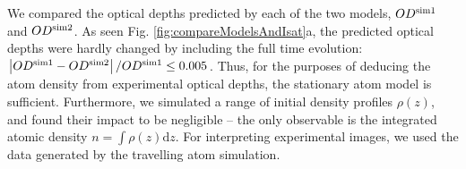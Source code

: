 \documentclass[12pt]{iopart}
\begin{document}
\par We compared the optical depths predicted by each of the two models, $OD^{\rm{sim1}}$ and $OD^{\rm{sim2}}$. As seen Fig. \ref{fig:compareModelsAndIsat}a, the predicted optical depths were hardly changed by including the full time evolution:  $\left|OD^{\rm{sim1}}-OD^{\rm{sim2}}\right|/OD^{\rm{sim1}} \le 0.005$. Thus, for the purposes of deducing the atom density from experimental optical depths, the stationary atom model is sufficient. Furthermore, we simulated a range of initial density profiles $\rho(z)$, and found their impact to be negligible \--- the only observable is the integrated atomic density $n=\int\rho(z)\mathrm{d}z$. For interpreting experimental images, we used the data generated by the travelling atom simulation.
\begin{figure}

\end{figure}
\end{document}
